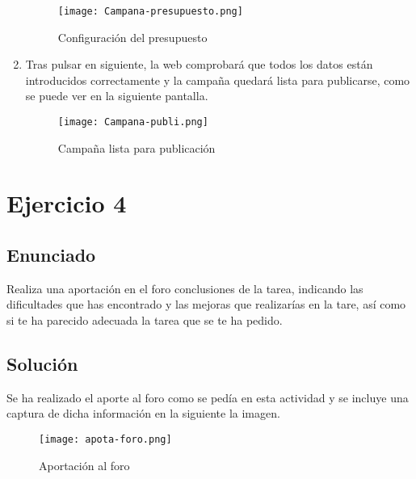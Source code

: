 \begin{enumerate}
      \begin{figure}[H]
          \centering
          \texttt{[image: Campana-presupuesto.png]}
          \caption{Configuración del presupuesto}
      \end{figure}

      \item Tras pulsar en siguiente, la web comprobará que todos los datos están introducidos correctamente y la campaña quedará lista para publicarse, como se puede ver en la siguiente pantalla.

      \begin{figure}[H]
          \centering
          \texttt{[image: Campana-publi.png]}
          \caption{Campaña lista para publicación}
      \end{figure}
\end{enumerate}

\section{Ejercicio 4}
\subsection{Enunciado}
Realiza una aportación en el foro conclusiones de la tarea, indicando las dificultades que has encontrado y las mejoras que realizarías en la tare, así como si te ha parecido adecuada la tarea que se te ha pedido.

\subsection{Solución}
Se ha realizado el aporte al foro como se pedía en esta actividad y se incluye una captura de dicha información en la siguiente la imagen.

\begin{figure}[H]
    \centering
    \texttt{[image: apota-foro.png]}
    \caption{Aportación al foro}
\end{figure}


%
%

